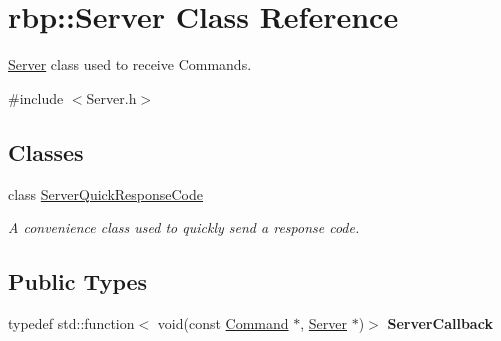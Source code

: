 \hypertarget{classrbp_1_1Server}{}\section{rbp\+:\+:Server Class Reference}
\label{classrbp_1_1Server}


\hyperlink{classrbp_1_1Server}{Server} class used to receive Commands.  




{\ttfamily \#include $<$Server.\+h$>$}

\subsection*{Classes}
\begin{DoxyCompactItemize}
\item 
class \hyperlink{classrbp_1_1Server_1_1ServerQuickResponseCode}{Server\+Quick\+Response\+Code}
\begin{DoxyCompactList}\small\item\em A convenience class used to quickly send a response code. \end{DoxyCompactList}\end{DoxyCompactItemize}
\subsection*{Public Types}
\begin{DoxyCompactItemize}
\item 
\hypertarget{classrbp_1_1Server_a8119bb8694bfa5cc978c38373ab23852}{}typedef std\+::function$<$ void(const \hyperlink{classrbp_1_1Command}{Command} $\ast$, \hyperlink{classrbp_1_1Server}{Server} $\ast$)$>$ {\bfseries Server\+Callback}\label{classrbp_1_1Server_a8119bb8694bfa5cc978c38373ab23852}

\end{DoxyCompactItemize}
